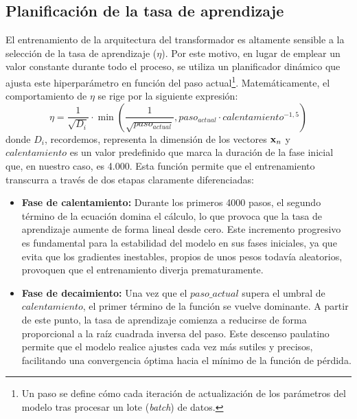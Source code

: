 \subsection{Planificación de la tasa de aprendizaje}

El entrenamiento de la arquitectura del transformador es altamente sensible a la selección de la tasa de aprendizaje ($\eta$). 
Por este motivo, en lugar de emplear un valor constante durante todo el proceso, se utiliza un planificador dinámico que ajusta este 
hiperparámetro en función del paso actual\footnote{Un paso se define cómo cada iteración de actualización de los parámetros del modelo 
tras procesar un lote (\textit{batch}) de datos.}. Matemáticamente, el comportamiento de $\eta$ se rige por la siguiente expresión:
\begin{equation}
    \eta = \frac{1}{\sqrt{D_{i}}} \cdot \min \left( \frac{1}{\sqrt{paso_{actual}}}, paso_{actual} \cdot calentamiento^{-1,5} \right)
\end{equation}
donde $D_{i}$, recordemos, representa la dimensión de los vectores $\mathbf{x}_n$ y $calentamiento$ es un valor predefinido que marca la duración de la 
fase inicial que, en nuestro caso, es 4.000. Esta función permite que el entrenamiento transcurra a través de dos etapas 
claramente diferenciadas:

\begin{itemize}
    \item \textbf{Fase de calentamiento:} Durante los primeros 4000 pasos, el segundo término de la ecuación domina el cálculo, lo que provoca 
    que la tasa de aprendizaje aumente de forma lineal desde cero. Este incremento progresivo es fundamental para la estabilidad del modelo en 
    sus fases iniciales, ya que evita que los gradientes inestables, propios de unos pesos todavía aleatorios, provoquen que el entrenamiento 
    diverja prematuramente.
    \item \textbf{Fase de decaimiento:} Una vez que el $paso\_actual$ supera el umbral de $calentamiento$, el primer término de la función se 
    vuelve dominante. A partir de este punto, la tasa de aprendizaje comienza a reducirse de forma proporcional a la raíz cuadrada inversa 
    del paso. Este descenso paulatino permite que el modelo realice ajustes cada vez más sutiles y precisos, facilitando una convergencia 
    óptima hacia el mínimo de la función de pérdida.
\end{itemize}



